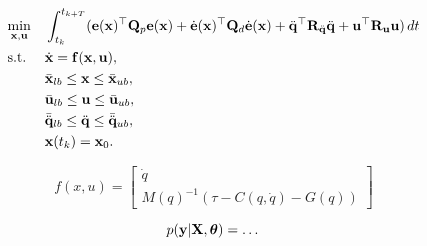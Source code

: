 \begin{equation*}
  \begin{aligned}
      & \underset{\mathbf{x}, \mathbf{u}}{\text{min}}
      & & \int_{t_k}^{t_{k+T}} ( \mathbf{e}(\mathbf{x})^{\top} \mathbf{Q}_p \mathbf{e}(\mathbf{x}) +
      \dot{\mathbf{e}}(\mathbf{x})^{\top} \mathbf{Q}_d \dot{\mathbf{e}}(\mathbf{x}) +
      \ddot{\mathbf{q}}^{\top} \mathbf{R}_{\ddot{\mathbf{q}}} \ddot{\mathbf{q}} +
      \mathbf{u}^{\top} \mathbf{R}_{\mathbf{u}} \mathbf{u} ) \,dt\\
      & \text{s.t.}
      & & \dot{\mathbf{x}} = \mathbf{f}(\mathbf{x},\mathbf{u}), \\
      &&& \bar{\mathbf{x}}_{lb} \leq \mathbf{x} \leq \bar{\mathbf{x}}_{ub}, \\
      &&& \bar{\mathbf{u}}_{lb} \leq \mathbf{u} \leq \bar{\mathbf{u}}_{ub}, \\
      &&& \bar{\ddot{\mathbf{q}}}_{lb} \leq \ddot{\mathbf{q}} \leq \bar{\ddot{\mathbf{q}}}_{ub}, \\
      &&& \mathbf{x}(t_k) = \mathbf{x}_0. \\
      \end{aligned}
\end{equation*}

\begin{equation*}
  f(x,u) = \begin{bmatrix} \dot{q} \\ M(q)^{-1} (\tau - C(q, \dot{q}) - G(q)) \end{bmatrix}
\end{equation*}

\begin{equation*}
  p(\mathbf{y} | \mathbf{X}, \boldsymbol{\theta}) = \dots
\end{equation*}
